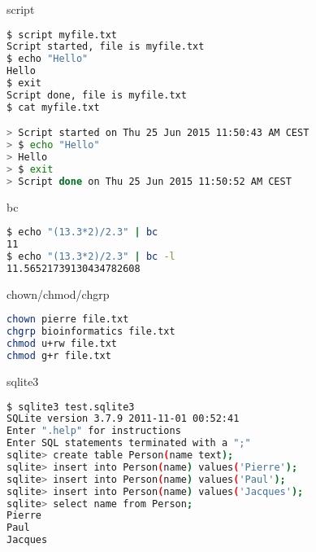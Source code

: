 \documentclass{beamer}
\begin{document}
\begin{frame}[fragile]
 \begin{center}
    \huge{script}\\
    \end{center}
\begin{lstlisting}[language=bash,breaklines=true]
$ script myfile.txt
Script started, file is myfile.txt
$ echo "Hello"
Hello
$ exit
Script done, file is myfile.txt
$ cat myfile.txt 

> Script started on Thu 25 Jun 2015 11:50:43 AM CEST
> $ echo "Hello"
> Hello
> $ exit
> Script done on Thu 25 Jun 2015 11:50:52 AM CEST

 \end{lstlisting}
\end{frame} 


\begin{frame}[fragile]
 \begin{center}
    \huge{bc}\\
  \end{center}
\begin{lstlisting}[language=bash]
$ echo "(13.3*2)/2.3" | bc
11
$ echo "(13.3*2)/2.3" | bc -l
11.56521739130434782608
\end{lstlisting}
\end{frame}



\begin{frame}[fragile]
 \begin{center}
    \huge{chown/chmod/chgrp}\\
    \end{center}
\begin{lstlisting}[language=bash,breaklines=true]
chown pierre file.txt
chgrp bioinformatics file.txt
chmod u+rw file.txt
chmod g+r file.txt
\end{lstlisting}
\end{frame} 

\begin{frame}[fragile]
\begin{center}
    \huge{sqlite3}\\
    \end{center}
\begin{lstlisting}[language=bash]  
$ sqlite3 test.sqlite3
SQLite version 3.7.9 2011-11-01 00:52:41
Enter ".help" for instructions
Enter SQL statements terminated with a ";"
sqlite> create table Person(name text);
sqlite> insert into Person(name) values('Pierre');
sqlite> insert into Person(name) values('Paul');
sqlite> insert into Person(name) values('Jacques');
sqlite> select name from Person;
Pierre
Paul
Jacques
\end{lstlisting}
\end{frame}
\end{document}
